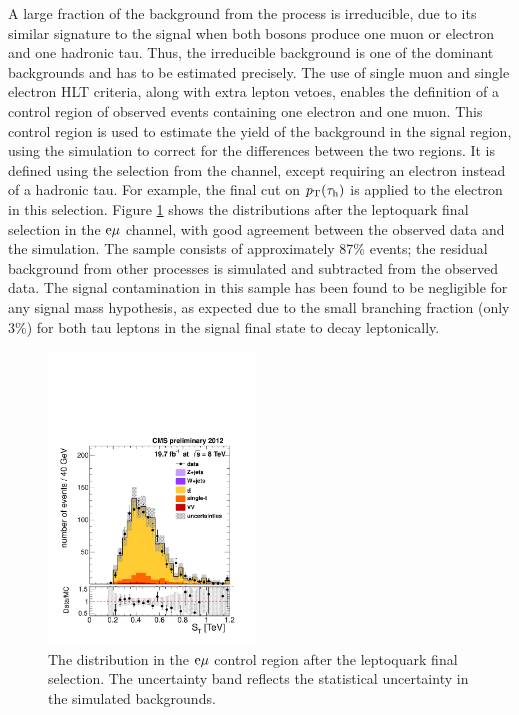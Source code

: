 A large fraction of the background from the \ttbar process is irreducible, due to its similar signature to the signal when both \W bosons produce one muon or electron and one hadronic tau. Thus, the \ttbar irreducible background is one of the dominant backgrounds and has to be estimated precisely. The use of single muon and single electron HLT criteria, along with extra lepton vetoes, enables the definition of a control region of observed events containing one electron and one muon. This \emu control region is used to estimate the yield of the \ttbar background in the signal region, using the simulation to correct for the differences between the two regions. It is defined using the selection from the \mutau channel, except requiring an electron instead of a hadronic tau. For example, the final cut on $p_{\mathrm{T}}(\tau_{\text{h}})$ is applied to the electron in this selection. Figure \ref{fig:ttCC} shows the \ST distributions after the leptoquark final selection in the $\mathrm{e}\mu$ channel, with good agreement between the observed data and the simulation. The \emu sample consists of approximately 87\% \ttbar events; the residual background from other processes is simulated and subtracted from the observed data. The signal contamination in this sample has been found to be negligible for any signal mass hypothesis, as expected due to the small branching fraction (only 3\%) for both tau leptons in the signal final state to decay leptonically.

\begin{figure}[hbt]
  \begin{center}
    \includegraphics[width=0.49\textwidth]{figures/bkgEstim/STbjetFinalEMu.pdf}
    \caption{The \ST distribution in the $\mathrm{e}\mu$ control region after the leptoquark final selection. The uncertainty band reflects the statistical uncertainty in the simulated backgrounds.}
    \label{fig:ttCC}
  \end{center}
\end{figure}


